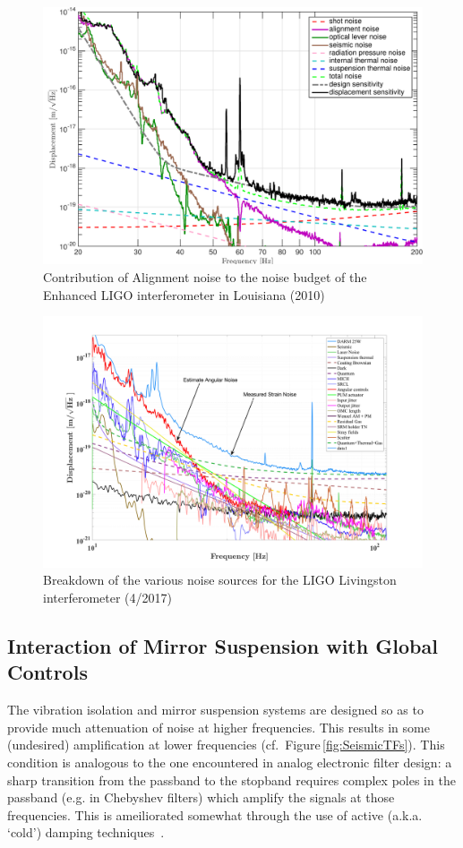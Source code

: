 \begin{figure}[h]
  \centering
    \includegraphics[width=\columnwidth]{Figures/S6_NB.pdf}
    \caption{Contribution of Alignment noise to the noise budget of the
    Enhanced LIGO interferometer in Louisiana (2010)}
    \label{fig:eLIGO}
\end{figure}

\begin{figure}[h]
    \includegraphics[width=\columnwidth]{Figures/L1-NB.pdf}
    \caption{Breakdown of the various noise sources for the LIGO Livingston interferometer (4/2017)}
    \label{fig:aLIGO}
\end{figure}


\subsection{Interaction of Mirror Suspension with Global Controls}
The vibration isolation and mirror suspension systems are designed so as to
provide much attenuation of noise at higher frequencies.  This results in some (undesired) amplification at lower frequencies (cf.~Figure\,\ref{fig:SeismicTFs}). This condition is analogous to the
one encountered in analog electronic filter design: a sharp transition from
the passband to the stopband requires complex poles in the passband (e.g.
in Chebyshev filters) which amplify the signals at those frequencies. This
is ameiliorated somewhat through the use of active (a.k.a. `cold') damping
techniques~\cite{Kuroda:1982vf, Forward:1979ks, Shapiro:2015di}.


